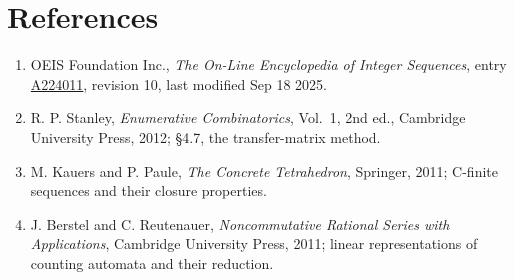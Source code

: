 \documentclass[11pt]{article}
\theoremstyle{definition}
\begin{document}
\section{References}

\begin{enumerate}

\item OEIS Foundation Inc., \emph{The On-Line Encyclopedia of Integer Sequences}, entry \href{https://oeis.org/A224011}{A224011}, revision 10, last modified Sep 18 2025.

\item R. P. Stanley, \emph{Enumerative Combinatorics}, Vol.~1, 2nd ed., Cambridge University Press, 2012; \S4.7, the transfer-matrix method.

\item M. Kauers and P. Paule, \emph{The Concrete Tetrahedron}, Springer, 2011; C-finite sequences and their closure properties.

\item J. Berstel and C. Reutenauer, \emph{Noncommutative Rational Series with Applications}, Cambridge University Press, 2011; linear representations of counting automata and their reduction.

\end{enumerate}
\end{document}
